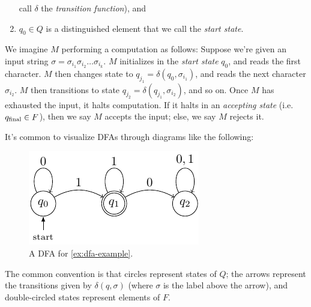 \documentclass{fkpaper}
\begin{document}
\begin{multicols}{2}
\begin{definition}
\begin{enumerate}
      call $\delta$ the \emph{transition function}), and
    \item $q_0 \in Q$ is a distinguished element that we call the
      \emph{start state}. \qedhere
  \end{enumerate}
\end{definition}
We imagine $M$ performing a computation as follows: Suppose we're
given an input string $\sigma = \sigma_{i_1} \sigma_{i_2} \ldots
\sigma_{i_k}$. $M$ initializes in the \emph{start state} $q_0$, and
reads the first character. $M$ then changes state to $q_{j_1} =
\delta(q_0, \sigma_{i_1})$, and reads the next character
$\sigma_{i_2}$. $M$ then transitions to state $q_{j_2} =
\delta(q_{j_1}, \sigma_{i_2})$, and so on. Once $M$ has exhausted the
input, it halts computation. If it halts in an \emph{accepting state}
(i.e.\ $q_{\rm final} \in F$), then we say $M$ accepts the input;
else, we say $M$ rejects it.

It's common to visualize DFAs through diagrams like the following:
\begin{figure}[H]
  \centering
  \includegraphics[scale=1.2]{figures/dfa-example.pdf}
  \caption{A DFA for \cref{ex:dfa-example}.}
\end{figure}
The common convention is that circles represent states of $Q$; the
arrows represent the transitions given by $\delta(q, \sigma)$ (where
$\sigma$ is the label above the arrow), and double-circled states
represent elements of $F$.




\subsection{}















\end{multicols}
\end{document}
